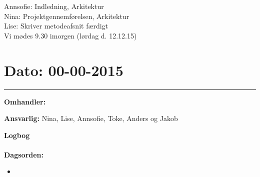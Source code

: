 Annsofie: Indledning, Arkitektur\\
Nina: Projektgennemførelsen, Arkitektur\\
Lise: Skriver metodeafsnit færdigt\\
Vi mødes 9.30 imorgen (lørdag d. 12.12.15)\\


	
	
\section{Dato: 00-00-2015 }
\hrule

\textbf{Omhandler:} 

\textbf{Ansvarlig:} Nina, Lise, Annsofie, Toke, Anders og Jakob

\textbf{Logbog}
\\
\\
\textbf{Dagsorden:}
\begin{itemize}
	\item 
\end{itemize}
